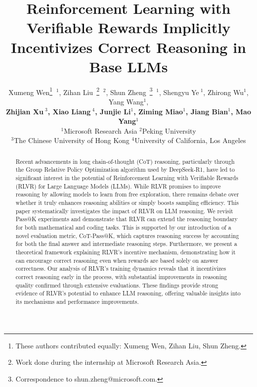 \documentclass{article} %
\title{Reinforcement Learning with Verifiable Rewards Implicitly Incentivizes Correct Reasoning in Base LLMs}
\author{Xumeng Wen\thanks{These authors contributed equally: Xumeng Wen, Zihan Liu, Shun Zheng.} $~^1$,
Zihan Liu\footnotemark[1] ~\thanks{Work done during the internship at Microsoft Research Asia.} $~^2$,
Shun Zheng\footnotemark[1] ~\thanks{Correspondence to shun.zheng@microsoft.com.} $~^1$,
Shengyu Ye\footnotemark[2] $~^1$, 
Zhirong Wu$^1$,
Yang Wang$^1$,
\\
\textbf{
Zhijian Xu\footnotemark[2] $~^3$,
Xiao Liang\footnotemark[2] $~^4$,
Junjie Li$^1$,
Ziming Miao$^1$,
Jiang Bian$^1$,
Mao Yang$^1$} \\
$^1$Microsoft Research Asia
$^2$Peking University \\
$^3$The Chinese University of Hong Kong
$^4$University of California, Los Angeles
}
\begin{document}
\maketitle

\begin{abstract}
Recent advancements in long chain-of-thought (CoT) reasoning, particularly through the Group Relative Policy Optimization algorithm used by DeepSeek-R1, have led to significant interest in the potential of Reinforcement Learning with Verifiable Rewards (RLVR) for Large Language Models (LLMs). While RLVR promises to improve reasoning by allowing models to learn from free exploration, there remains debate over whether it truly enhances reasoning abilities or simply boosts sampling efficiency. This paper systematically investigates the impact of RLVR on LLM reasoning. We revisit Pass@K experiments and demonstrate that RLVR can extend the reasoning boundary for both mathematical and coding tasks. This is supported by our introduction of a novel evaluation metric, CoT-Pass@K, which captures reasoning success by accounting for both the final answer and intermediate reasoning steps. Furthermore, we present a theoretical framework explaining RLVR’s incentive mechanism, demonstrating how it can encourage correct reasoning even when rewards are based solely on answer correctness. Our analysis of RLVR’s training dynamics reveals that it incentivizes correct reasoning early in the process, with substantial improvements in reasoning quality confirmed through extensive evaluations. These findings provide strong evidence of RLVR’s potential to enhance LLM reasoning, offering valuable insights into its mechanisms and performance improvements.
\end{abstract}

\end{document}
